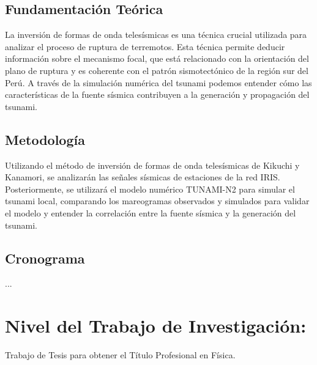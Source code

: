 \documentclass[spanish,a4paper,11pt]{article}
\begin{document}
\subsection{Fundamentación Teórica} 
\noindent La inversión de formas de onda telesísmicas es una técnica crucial utilizada para analizar el proceso de ruptura de terremotos. Esta técnica permite deducir información sobre el mecanismo focal, que está relacionado con la orientación del plano de ruptura y es coherente con el patrón sismotectónico de la región sur del Perú. A través de la simulación numérica del tsunami podemos entender cómo las características de la fuente sísmica contribuyen a la generación y propagación del tsunami.

\subsection{Metodología} 
\noindent Utilizando el método de inversión de formas de onda telesísmicas de Kikuchi y Kanamori, se analizarán las señales sísmicas de estaciones de la red IRIS. Posteriormente, se utilizará el modelo numérico TUNAMI-N2 para simular el tsunami local, comparando los mareogramas observados y simulados para validar el modelo y entender la correlación entre la fuente sísmica y la generación del tsunami.

\subsection{Cronograma} 
...

\section{Nivel del Trabajo de Investigación:} \noindent 
Trabajo de Tesis para obtener el Título Profesional en Física.  \\
\end{document}

